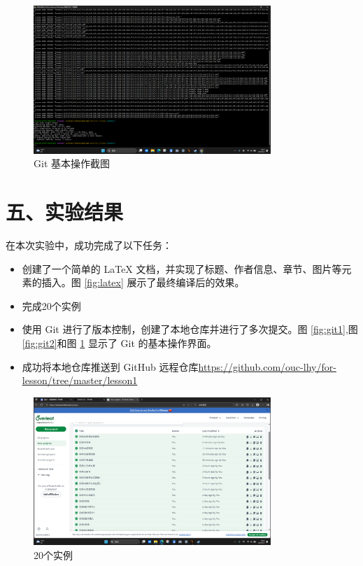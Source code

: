\documentclass[a4paper, 12pt]{article}
\begin{document}
\begin{enumerate}
    \begin{figure}[htbp]
        \centering
        \includegraphics[width=0.8\textwidth]{git3.png}%
        \caption{Git 基本操作截图}
        \label{fig:git3}
    \end{figure}
    
\end{enumerate}

\section*{五、实验结果}
在本次实验中，成功完成了以下任务：
\begin{itemize}
    \item 创建了一个简单的 LaTeX 文档，并实现了标题、作者信息、章节、图片等元素的插入。图 \ref{fig:latex} 展示了最终编译后的效果。
    \item 完成20个实例
    \item 使用 Git 进行了版本控制，创建了本地仓库并进行了多次提交。图 \ref{fig:git1},图 \ref{fig:git2}和图 \ref{fig:git3} 显示了 Git 的基本操作界面。
    \item 成功将本地仓库推送到 GitHub 远程仓库\url{https://github.com/ouc-lhy/for-lesson/tree/master/lesson1}
\end{itemize}

\begin{figure}[htbp]
        \centering
        \includegraphics[width=0.8\textwidth]{20实例.png}%
        \caption{20个实例}
        \label{fig:实例}
\end{figure}
    
\end{document}
